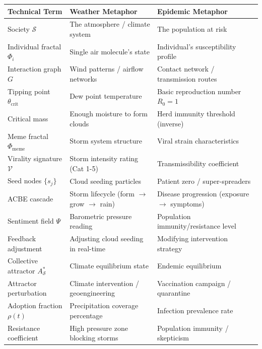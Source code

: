 \documentclass[11pt,twoside]{book}
\theoremstyle{definition}
\theoremstyle{plain}
\theoremstyle{remark}
\newcommand{\Frac}{\Phi}
\begin{document}
\begin{center}
\small
\begin{tabularx}{\textwidth}{>{\raggedright\arraybackslash}p{3.5cm}|>{\raggedright\arraybackslash}X|>{\raggedright\arraybackslash}X}
\toprule
\textbf{Technical Term} & \textbf{Weather Metaphor} & \textbf{Epidemic Metaphor} \\
\midrule
Society $\mathcal{S}$ & The atmosphere / climate system & The population at risk \\
\midrule
Individual fractal $\Frac_i$ & Single air molecule's state & Individual's susceptibility profile \\
\midrule
Interaction graph $G$ & Wind patterns / airflow networks & Contact network / transmission routes \\
\midrule
Tipping point $\theta_{\mathrm{crit}}$ & Dew point temperature & Basic reproduction number $R_0 = 1$ \\
\midrule
Critical mass & Enough moisture to form clouds & Herd immunity threshold (inverse) \\
\midrule
Meme fractal $\Frac_{\mathrm{meme}}$ & Storm system structure & Viral strain characteristics \\
\midrule
Virality signature $\mathcal{V}$ & Storm intensity rating (Cat 1-5) & Transmissibility coefficient \\
\midrule
Seed nodes $\{s_j\}$ & Cloud seeding particles & Patient zero / super-spreaders \\
\midrule
ACBE cascade & Storm lifecycle (form $\to$ grow $\to$ rain) & Disease progression (exposure $\to$ symptoms) \\
\midrule
Sentiment field $\Psi$ & Barometric pressure reading & Population immunity/resistance level \\
\midrule
Feedback adjustment & Adjusting cloud seeding in real-time & Modifying intervention strategy \\
\midrule
Collective attractor $A_{\mathcal{S}}^*$ & Climate equilibrium state & Endemic equilibrium \\
\midrule
Attractor perturbation & Climate intervention / geoengineering & Vaccination campaign / quarantine \\
\midrule
Adoption fraction $\rho(t)$ & Precipitation coverage percentage & Infection prevalence rate \\
\midrule
Resistance coefficient & High pressure zone blocking storms & Population immunity / skepticism \\
\bottomrule
\end{tabularx}
\end{center}
\end{document}
